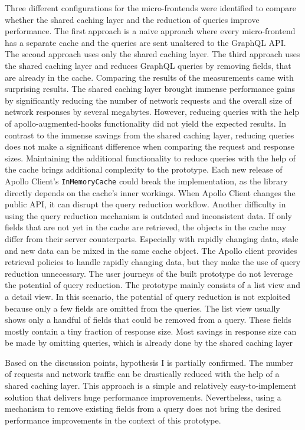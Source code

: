 \noindent Three different configurations for the micro-frontends were identified to compare whether the shared caching layer and the reduction of queries improve performance. The first approach is a naive approach where every micro-frontend has a separate cache and the queries are sent unaltered to the GraphQL \ac{API}. The second approach uses only the shared caching layer. The third approach uses the shared caching layer and reduces GraphQL queries by removing fields, that are already in the cache. Comparing the results of the measurements came with surprising results. The shared caching layer brought immense performance gains by significantly reducing the number of network requests and the overall size of network responses by several megabytes. However, reducing queries with the help of apollo-augmented-hooks functionality did not yield the expected results. In contrast to the immense savings from the shared caching layer, reducing queries does not make a significant difference when comparing the request and response sizes. Maintaining the additional functionality to reduce queries with the help of the cache brings additional complexity to the prototype. Each new release of Apollo Client's \texttt{InMemoryCache} could break the implementation, as the library directly depends on the cache's inner workings. When Apollo Client changes the public \ac{API}, it can disrupt the query reduction workflow. Another difficulty in using the query reduction mechanism is outdated and inconsistent data. If only fields that are not yet in the cache are retrieved, the objects in the cache may differ from their server counterparts. Especially with rapidly changing data, stale and new data can be mixed in the same cache object. The Apollo client provides retrieval policies to handle rapidly changing data, but they make the use of query reduction unnecessary. The user journeys of the built prototype do not leverage the potential of query reduction. The prototype mainly consists of a list view and a detail view. In this scenario, the potential of query reduction is not exploited because only a few fields are omitted from the queries. The list view usually shows only a handful of fields that could be removed from a query. These fields mostly contain a tiny fraction of response size. Most savings in response size can be made by omitting queries, which is already done by the shared caching layer

\bigskip

\noindent Based on the discussion points, hypothesis I is partially confirmed. The number of requests and network traffic can be drastically reduced with the help of a shared caching layer. This approach is a simple and relatively easy-to-implement solution that delivers huge performance improvements. Nevertheless, using a mechanism to remove existing fields from a query does not bring the desired performance improvements in the context of this prototype. 

